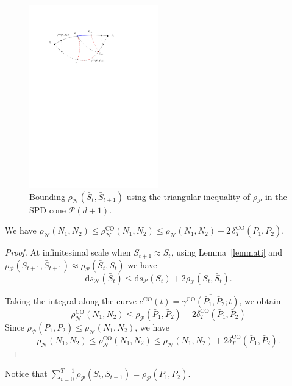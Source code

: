 \documentclass[entropy,article,accept,oneauthor,pdftex,entropy]{Definitions/mdpi}
\def\CO{\mathrm{CO}}
\def\calN{\mathcal{N}}
\def\calP{\mathcal{P}}
\def\barP{{\bar P}}
\def\ds{\mathrm{d}s}
\begin{document}
\begin{figure}[H]

 
\includegraphics[width=0.5\textwidth]{FigIpe-ControlCOApproximation.pdf}  
 
%
\caption{Bounding $\rho_\calN(\bar S_t,\bar S_{t+1})$ using the triangular inequality of $\rho_\calP$ in the SPD cone $\calP(d+1)$.
 \label{fig:approxCO}}
\end{figure}

\begin{Property}
We have 
$\rho_\calN(N_1,N_2)\leq \rho_\calN^\CO(N_1,N_2) \leq  \rho_\calN(N_1,N_2) + 2\, \delta^\CO_T(\bar P_1,\bar P_2)$.
\end{Property}

\begin{proof}
At infinitesimal scale when $S_{t+1}\approx S_t$, using Lemma~\ref{lemmati} and $\rho_\calP(S_{t+1},\bar S_{t+1})\approx \rho_\calP(\bar S_t,S_t)$ we have
$$
\ds_{\calN}(\bar S_t) \leq \ds_{\calP}(S_t) + 2\rho_\calP(S_t,\bar S_t). 
$$

Taking the integral along the curve $c^\CO(t)=\overline{\gamma^\CO(\barP_1,\barP_2;t)}$, we obtain
$$
\rho_\calN^\CO(N_1,N_2)\leq \rho_\calP(\bar P_1,\bar P_2) + 2 \delta^\CO_T(\bar P_1,\bar P_2)
$$
Since $\rho_\calP(\barP_1,\barP_2)\leq \rho_\calN(N_1,N_2)$, we have
$$
\rho_\calN(N_1,N_2)\leq \rho_\calN^\CO(N_1,N_2) \leq  \rho_\calN(N_1,N_2) + 2 \delta^\CO_T(\bar P_1,\bar P_2).
$$
\end{proof}

Notice that $\sum_{i=0}^{T-1} \rho_\calP(S_t,S_{t+1})=\rho_\calP(\barP_1,\barP_2)$.
\end{document}
